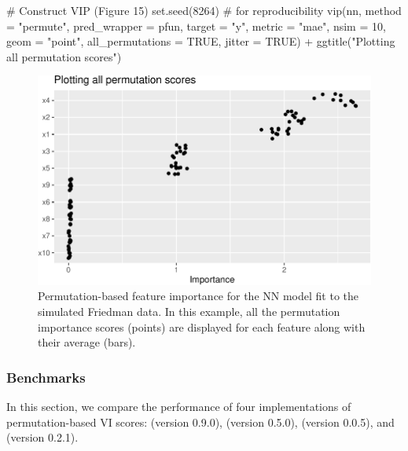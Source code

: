 \begin{Schunk}
\begin{Sinput}
# Construct VIP (Figure 15)
set.seed(8264)  # for reproducibility
vip(nn, method = "permute", pred_wrapper = pfun, target = "y", metric = "mae",
    nsim = 10, geom = "point", all_permutations = TRUE, jitter = TRUE) +
  ggtitle("Plotting all permutation scores")
\end{Sinput}
\begin{figure}[!htb]

{\centering \includegraphics[width=0.7\linewidth]{greenwell-boehmke_files/figure-latex/vip-nn-mae-all-1}

}

\caption[Permutation-based feature importance for the NN model fit to the simulated Friedman data]{Permutation-based feature importance for the NN model fit to the simulated Friedman data. In this example, all the permutation importance scores (points) are displayed for each feature along with their average (bars).}\label{fig:vip-nn-mae-all}
\end{figure}
\end{Schunk}

\subsubsection{Benchmarks}

In this section, we compare the performance of four implementations of
permutation-based VI scores:  (version 0.9.0),
 (version 0.5.0),
\newline {} (version 0.0.5), and
 (version 0.2.1).

